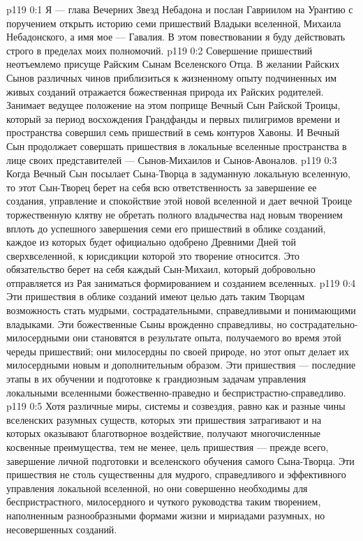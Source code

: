\author{Глава Вечерних Звезд}
\vs p119 0:1 Я --- глава Вечерних Звезд Небадона и послан Гавриилом на Урантию с поручением открыть историю семи пришествий Владыки вселенной, Михаила Небадонского, а имя мое --- Гавалия. В этом повествовании я буду действовать строго в пределах моих полномочий.
\vs p119 0:2 \pc Совершение пришествий неотъемлемо присуще Райским Сынам Вселенского Отца. В желании Райских Сынов различных чинов приблизиться к жизненному опыту подчиненных им живых созданий отражается божественная природа их Райских родителей. Занимает ведущее положение на этом поприще Вечный Сын Райской Троицы, который за период восхождения Грандфанды и первых пилигримов времени и пространства совершил семь пришествий в семь контуров Хавоны. И Вечный Сын продолжает совершать пришествия в локальные вселенные пространства в лице своих представителей --- Сынов\hyp{}Михаилов и Сынов\hyp{}Авоналов.
\vs p119 0:3 Когда Вечный Сын посылает Сына\hyp{}Творца в задуманную локальную вселенную, то этот Сын\hyp{}Творец берет на себя всю ответственность за завершение ее создания, управление и спокойствие этой новой вселенной и дает вечной Троице торжественную клятву не обретать полного владычества над новым творением вплоть до успешного завершения семи его пришествий в облике созданий, каждое из которых будет официально одобрено Древними Дней той сверхвселенной, к юрисдикции которой это творение относится. Это обязательство берет на себя каждый Сын\hyp{}Михаил, который добровольно отправляется из Рая заниматься формированием и созданием вселенных.
\vs p119 0:4 Эти пришествия в облике созданий имеют целью дать таким Творцам возможность стать мудрыми, сострадательными, справедливыми и понимающими владыками. Эти божественные Сыны врожденно справедливы, но сострадательно\hyp{}милосердными они становятся в результате опыта, получаемого во время этой череды пришествий; они милосердны по своей природе, но этот опыт делает их милосердными новым и дополнительным образом. Эти пришествия --- последние этапы в их обучении и подготовке к грандиозным задачам управления локальными вселенными божественно\hyp{}праведно и беспристрастно\hyp{}справедливо.
\vs p119 0:5 Хотя различные миры, системы и созвездия, равно как и разные чины вселенских разумных существ, которых эти пришествия затрагивают и на которых оказывают благотворное воздействие, получают многочисленные косвенные преимущества, тем не менее, цель пришествия --- прежде всего, завершение личной подготовки и вселенского обучения самого Сына\hyp{}Творца. Эти пришествия не столь существенны для мудрого, справедливого и эффективного управления локальной вселенной, но они совершенно необходимы для беспристрастного, милосердного и чуткого руководства таким творением, наполненным разнообразными формами жизни и мириадами разумных, но несовершенных созданий.
